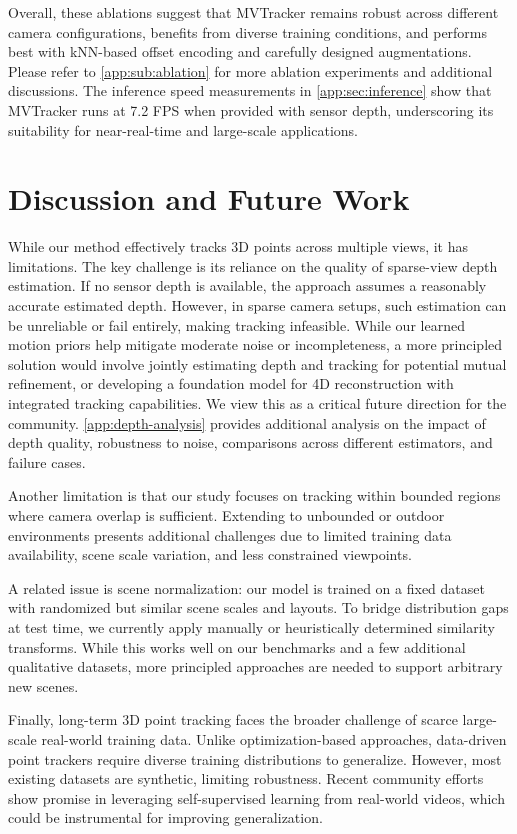 \documentclass[10pt,twocolumn,letterpaper]{article}
\begin{document}
Overall, these ablations suggest that MVTracker remains robust across different camera configurations, benefits from diverse training conditions, and performs best with kNN-based offset encoding and carefully designed augmentations. Please refer to \cref{app:sub:ablation} for more ablation experiments and additional discussions. The inference speed measurements in \cref{app:sec:inference} show that MVTracker runs at 7.2 FPS when provided with sensor depth, underscoring its suitability for near-real-time and large-scale applications.

\section{Discussion and Future Work} \label{sec:discussion}
While our method effectively tracks 3D points across multiple views, it has limitations. The key challenge is its reliance on the quality of sparse-view depth estimation. If no sensor depth is available, the approach assumes a reasonably accurate estimated depth. However, in sparse camera setups, such estimation can be unreliable or fail entirely, making tracking infeasible. While our learned motion priors help mitigate moderate noise or incompleteness, a more principled solution would involve jointly estimating depth and tracking for potential mutual refinement, or developing a foundation model for 4D reconstruction with integrated tracking capabilities. We view this as a critical future direction for the community. \cref{app:depth-analysis} provides additional analysis on the impact of depth quality, robustness to noise, comparisons across different estimators, and failure cases.

Another limitation is that our study focuses on tracking within bounded regions where camera overlap is sufficient. Extending to unbounded or outdoor environments presents additional challenges due to limited training data availability, scene scale variation, and less constrained viewpoints.

A related issue is scene normalization: our model is trained on a fixed dataset with randomized but similar scene scales and layouts. To bridge distribution gaps at test time, we currently apply manually or heuristically determined similarity transforms. While this works well on our benchmarks and a few additional qualitative datasets, more principled approaches are needed to support arbitrary new scenes.

Finally, long-term 3D point tracking faces the broader challenge of scarce large-scale real-world training data. Unlike optimization-based approaches, data-driven point trackers require diverse training distributions to generalize. However, most existing datasets are synthetic, limiting robustness. Recent community efforts~\cite{karaev24cotracker3,doersch2024bootstap} show promise in leveraging self-supervised learning from real-world videos, which could be instrumental for improving generalization.
\end{document}
